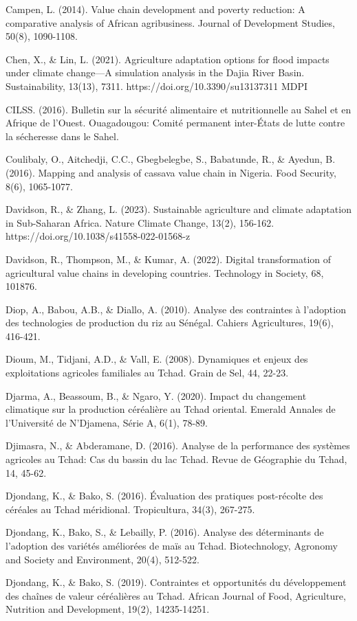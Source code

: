 \documentclass[12pt,oneside]{report}
\begin{document}
Campen, L. (2014). Value chain development and poverty reduction: A comparative analysis of African agribusiness. Journal of Development Studies, 50(8), 1090-1108.

Chen, X., \& Lin, L. (2021). Agriculture adaptation options for flood impacts under climate change—A simulation analysis in the Dajia River Basin. Sustainability, 13(13), 7311. https://doi.org/10.3390/su13137311 MDPI

CILSS. (2016). Bulletin sur la sécurité alimentaire et nutritionnelle au Sahel et en Afrique de l'Ouest. Ouagadougou: Comité permanent inter-États de lutte contre la sécheresse dans le Sahel.

Coulibaly, O., Aitchedji, C.C., Gbegbelegbe, S., Babatunde, R., \& Ayedun, B. (2016). Mapping and analysis of cassava value chain in Nigeria. Food Security, 8(6), 1065-1077.

Davidson, R., \& Zhang, L. (2023). Sustainable agriculture and climate adaptation in Sub-Saharan Africa. Nature Climate Change, 13(2), 156-162. https://doi.org/10.1038/s41558-022-01568-z

Davidson, R., Thompson, M., \& Kumar, A. (2022). Digital transformation of agricultural value chains in developing countries. Technology in Society, 68, 101876.

Diop, A., Babou, A.B., \& Diallo, A. (2010). Analyse des contraintes à l'adoption des technologies de production du riz au Sénégal. Cahiers Agricultures, 19(6), 416-421.

Dioum, M., Tidjani, A.D., \& Vall, E. (2008). Dynamiques et enjeux des exploitations agricoles familiales au Tchad. Grain de Sel, 44, 22-23.

Djarma, A., Beassoum, B., \& Ngaro, Y. (2020). Impact du changement climatique sur la production céréalière au Tchad oriental. Emerald Annales de l'Université de N'Djamena, Série A, 6(1), 78-89.

Djimasra, N., \& Abderamane, D. (2016). Analyse de la performance des systèmes agricoles au Tchad: Cas du bassin du lac Tchad. Revue de Géographie du Tchad, 14, 45-62.

Djondang, K., \& Bako, S. (2016). Évaluation des pratiques post-récolte des céréales au Tchad méridional. Tropicultura, 34(3), 267-275.

Djondang, K., Bako, S., \& Lebailly, P. (2016). Analyse des déterminants de l'adoption des variétés améliorées de maïs au Tchad. Biotechnology, Agronomy and Society and Environment, 20(4), 512-522.

Djondang, K., \& Bako, S. (2019). Contraintes et opportunités du développement des chaînes de valeur céréalières au Tchad. African Journal of Food, Agriculture, Nutrition and Development, 19(2), 14235-14251.
\end{document}

